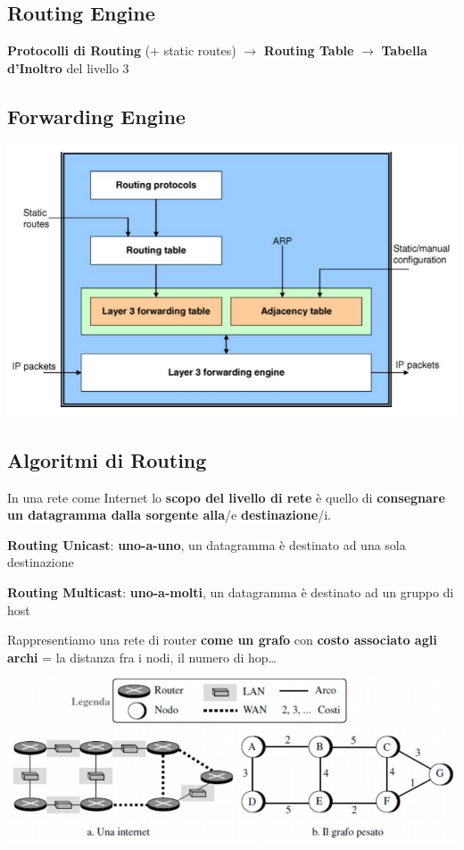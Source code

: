 \documentclass[10pt]{article}
\begin{document}
\subsection{Routing Engine}
\textbf{Protocolli di Routing} (+ static routes) $\longrightarrow$ \textbf{Routing Table} $\longrightarrow$ \textbf{Tabella d'Inoltro} del livello 3
\subsection{Forwarding Engine}
\begin{center}
\includegraphics[scale=0.7]{forwardingengine.png}
\end{center}
\subsection{Algoritmi di Routing}
In una rete come Internet lo \textbf{scopo del livello di rete} è quello di \textbf{consegnare un datagramma dalla sorgente alla}/e \textbf{destinazione}/i.
\begin{list}{}{}
\item \textbf{Routing Unicast}: \textbf{uno-a-uno}, un datagramma è destinato ad una sola destinazione
\item \textbf{Routing Multicast}: \textbf{uno-a-molti}, un datagramma è destinato ad un gruppo di host
\end{list}
Rappresentiamo una rete di router \textbf{come un grafo} con \textbf{costo associato agli archi} = la distanza fra i nodi, il numero di hop\ldots
\begin{center}
\includegraphics[scale=0.7]{routergrafo.png}
\end{center}
\pagebreak
\end{document}
